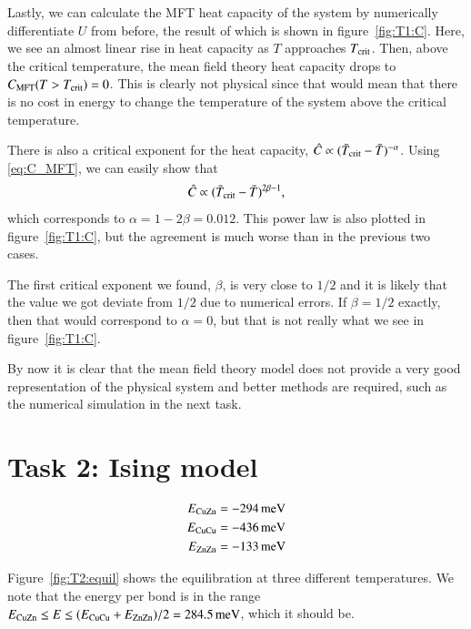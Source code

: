 Lastly, we can calculate the MFT heat capacity of the system by
numerically differentiate $U$ from before, the result of which is
shown in figure~\ref{fig:T1:C}. Here, we see an almost linear rise in
heat capacity as $T$ approaches $T_{\rm crit}$. Then, above the
critical temperature, the mean field theory heat capacity drops to
$C_{\text{MFT}}(T>T_{\rm crit})=0$. This is clearly not physical since that
would mean that there is no cost in energy to change the temperature
of the system above the critical temperature.

There is also a critical exponent for the heat capacity,
$\hat{C}\propto(\bar{T}_{\rm crit}-\bar{T})^{-\alpha}$. Using
\eqref{eq:C_MFT}, we can easily show that
\begin{equation}
\hat{C}\propto(\bar{T}_{\rm crit}-\bar{T})^{2\beta-1},
\end{equation}
which corresponds to $\alpha=1-2\beta=0.012$. This power law is also
plotted in figure~\ref{fig:T1:C}, but the agreement is much worse than
in the previous two cases.

The first critical exponent we found, $\beta$, is very close to
$1/2$ and it is likely that the value we got deviate from $1/2$
due to numerical errors. If $\beta=1/2$ exactly, then that would
correspond to $\alpha=0$, but that is not really what we see in
figure~\ref{fig:T1:C}.

By now it is clear that the mean field theory model does not provide a
very good representation of the physical system and better methods are
required, such as the numerical simulation in the next task.


\section*{Task 2: Ising model}
\begin{align}
E_{\rm CuZn} &= \unit[-294]{meV} \\
E_{\rm CuCu} &= \unit[-436]{meV} \\
E_{\rm ZnZn} &= \unit[-133]{meV} \\
\end{align}

Figure~\ref{fig:T2:equil} shows the equilibration at three different temperatures. We note that the energy per bond is in the range $E_{\rm CuZn} \leq E \leq (E_{\rm CuCu} + E_{\rm ZnZn})/2 = \unit[284.5]{meV}$, which it should be. 


